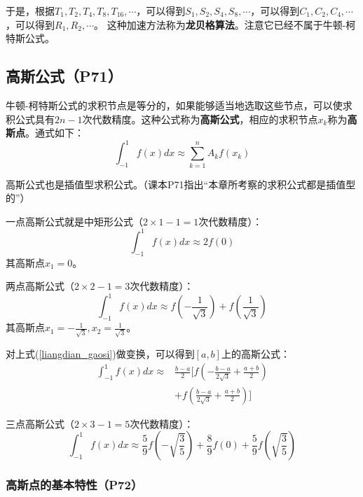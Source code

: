 \documentclass[fontset=ubuntu]{ctexart}
\numberwithin{equation}{section}
\numberwithin{theorem}{section}
\begin{document}
\begin{multicols}{2}
    于是，根据$T_1,T_2,T_4,T_8,T_{16},\cdots$，可以得到$S_1,S_2,S_4,S_8,\cdots$，可以得到$C_1,C_2,C_4,\cdots$，可以得到$R_1,R_2,\cdots$。
    这种加速方法称为\textbf{龙贝格算法}。注意它已经不属于牛顿-柯特斯公式。

    \subsection{高斯公式（P71）}

    牛顿-柯特斯公式的求积节点是等分的，如果能够适当地选取这些节点，可以使求积公式具有$2n-1$次代数精度。这种公式称为\textbf{高斯公式}，相应的求积节点$x_k$称为\textbf{高斯点}。通式如下：
    \begin{equation}
        \int_{-1}^{1}f(x)dx\approx \sum_{k=1}^{n}A_k f(x_k)
    \end{equation}

    高斯公式也是插值型求积公式。（课本P71指出“本章所考察的求积公式都是插值型的”）

    一点高斯公式就是中矩形公式（$2\times 1-1=1$次代数精度）：
    \begin{equation}
        \int_{-1}^{1}f(x)dx\approx 2f(0)
    \end{equation}
    其高斯点$x_1=0$。

    两点高斯公式（$2\times 2-1=3$次代数精度）：
    \begin{equation}
        \label{liangdian_gaosi}
        \int_{-1}^{1}f(x)dx\approx f\left(-\frac{1}{\sqrt{3}}\right)+f\left(\frac{1}{\sqrt{3}}\right)
    \end{equation}
    其高斯点$x_1=-\frac{1}{\sqrt{3}},x_2=\frac{1}{\sqrt{3}}$。

    对上式(\ref{liangdian_gaosi})做变换，可以得到$[a,b]$上的高斯公式：
    \begin{align}
        \int_{-1}^{1}f(x)dx\approx &\frac{b-a}{2}\biggl[ f\left(-\frac{b-a}{2\sqrt{3}}+\frac{a+b}{2}\right) \nonumber \\
        &+f\left(\frac{b-a}{2\sqrt{3}}+\frac{a+b}{2}\right)\biggr]
    \end{align}

    三点高斯公式（$2\times 3-1=5$次代数精度）：
    \begin{equation}
        \int_{-1}^{1}f(x)dx\approx \frac{5}{9}f\left(-\sqrt{\frac{3}{5}}\right)+\frac{8}{9}f(0)+\frac{5}{9}f\left(\sqrt{\frac{3}{5}}\right)
    \end{equation}

    \subsubsection{高斯点的基本特性（P72）}


\end{multicols}
\end{document}
